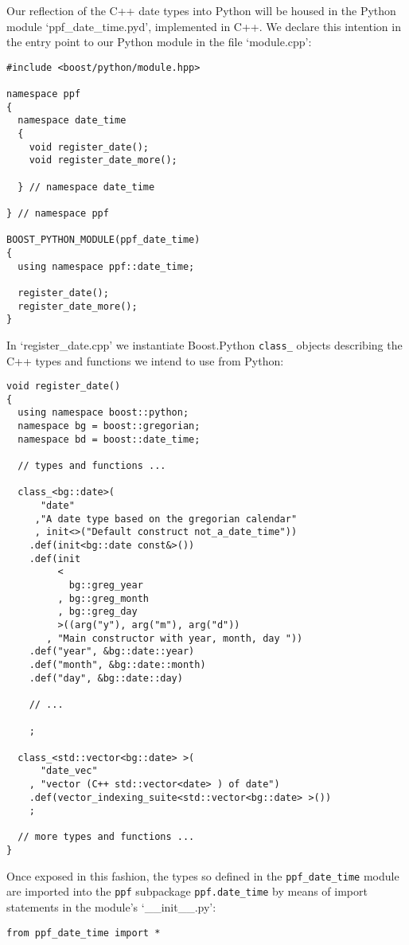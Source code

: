 Our reflection of the C++ date types into Python will be housed in the
Python module `ppf\_date\_time.pyd', implemented in C++.  We declare
this intention in the entry point to our Python module in the file
`module.cpp':
\begin{verbatim}
#include <boost/python/module.hpp>

namespace ppf
{
  namespace date_time
  {
    void register_date();
    void register_date_more();
    
  } // namespace date_time

} // namespace ppf

BOOST_PYTHON_MODULE(ppf_date_time)
{
  using namespace ppf::date_time;

  register_date();
  register_date_more();
}

\end{verbatim}
In `register\_date.cpp' we instantiate Boost.Python
\verb|class_| objects describing the C++ types and functions we intend
to use from Python:
\begin{verbatim}
void register_date()
{
  using namespace boost::python;
  namespace bg = boost::gregorian;
  namespace bd = boost::date_time;

  // types and functions ...

  class_<bg::date>(
      "date"
     ,"A date type based on the gregorian calendar"
     , init<>("Default construct not_a_date_time"))
    .def(init<bg::date const&>())
    .def(init
         <
           bg::greg_year
         , bg::greg_month
         , bg::greg_day
         >((arg("y"), arg("m"), arg("d"))
       , "Main constructor with year, month, day "))
    .def("year", &bg::date::year)
    .def("month", &bg::date::month)
    .def("day", &bg::date::day)

    // ...

    ;

  class_<std::vector<bg::date> >(
      "date_vec"
    , "vector (C++ std::vector<date> ) of date")
    .def(vector_indexing_suite<std::vector<bg::date> >())
    ;

  // more types and functions ...
}
\end{verbatim}
Once exposed in this fashion, the types so defined in the
\verb|ppf_date_time| module are imported into the \verb|ppf| subpackage
\verb|ppf.date_time| by means of import statements in the module's
`\_\_init\_\_.py':
\begin{verbatim}
from ppf_date_time import *
\end{verbatim}

